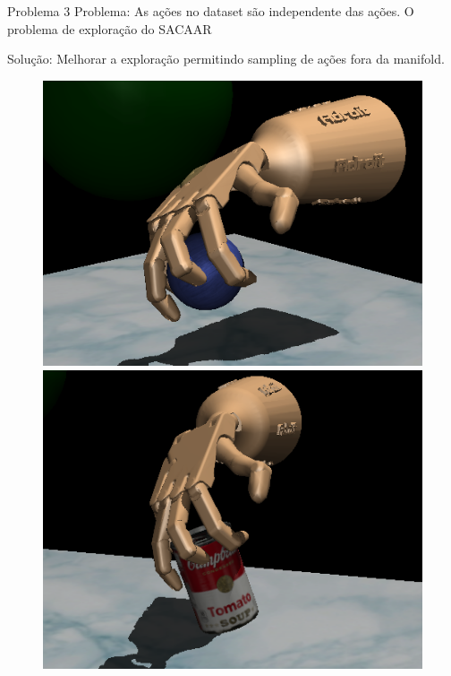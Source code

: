 \begin{frame}{Problema 3}
    Problema: As ações no dataset são independente das ações. O problema de exploração do SACAAR

    Solução: Melhorar a exploração permitindo sampling de ações fora da manifold. 

    \begin{figure}
        \begin{minipage}[t]{0.45\linewidth}
            \centering
            \vspace{0pt}
            \includegraphics[width=\textwidth]{img/sphere.png}
        \end{minipage}
        \hspace{0.5cm}
        \begin{minipage}[t]{0.45\linewidth}
            \centering
            \vspace{0pt}
            \includegraphics[width=\textwidth]{img/can.png}
        \end{minipage}
    \end{figure}
\end{frame}
